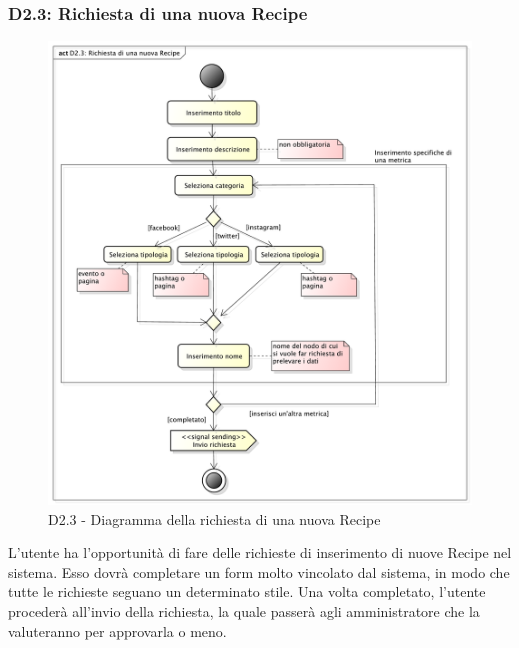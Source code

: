 		\subsubsection{D2.3: Richiesta di una nuova Recipe} %
		\label{ssub:richiesta_di_una_nuova_recipe}
		\begin{figure}[!htbp]
			\centering
			\centerline{\includegraphics[scale=0.45]{./images/D2_3.pdf}}
			\caption{D2.3 - Diagramma della richiesta di una nuova Recipe}
		\end{figure}
		\noindent
		L'utente ha l'opportunità di fare delle richieste di inserimento di nuove Recipe nel sistema. Esso dovrà completare un form molto vincolato dal sistema, in modo che tutte le richieste seguano un determinato stile. Una volta completato, l'utente procederà all'invio della richiesta, la quale passerà agli amministratore che la valuteranno per approvarla o meno.

